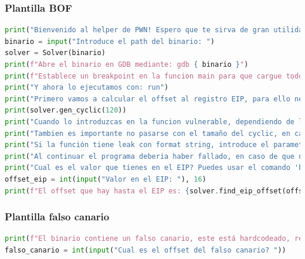 \subsubsection{Plantilla BOF}
\begin{lstlisting}[language=Python, caption=Plantilla BOF]
print("Bienvenido al helper de PWN! Espero que te sirva de gran utilidad!")
binario = input("Introduce el path del binario: ")
solver = Solver(binario)
print(f"Abre el binario en GDB mediante: gdb { binario }")
print(f"Establece un breakpoint en la funcion main para que cargue todo: b main")
print("Y ahora lo ejecutamos con: run")
print("Primero vamos a calcular el offset al registro EIP, para ello necesitamos ir a la funcion vulnerable e introducir un payload ciclico, por ejemplo:")
print(solver.gen_cyclic(120))
print("Cuando lo introduzcas en la funcion vulnerable, dependiendo de las mitigaciones habilitadas, el resultado podría ser diferente")
print("Tambien es importante no pasarse con el tamaño del cyclic, en caso de que se rompa el puntero a buf strcat podría fallar")
print("Si la función tiene leak con format string, introduce el parametro en la segunda funcion de input")
print("Al continuar el programa deberia haber fallado, en caso de que no sea asi, la longitud del payload no fue suficiente, intentalo con otro mas largo!")
print("Cual es el valor que tienes en el EIP? Puedes usar el comando 'bt' para ver el callstack, busca el valor justo despues de la funcion de input")
offset_eip = int(input("Valor en el EIP: "), 16)
print(f"El offset que hay hasta el EIP es: {solver.find_eip_offset(offset_eip)}")
\end{lstlisting}
\subsubsection{Plantilla falso canario}
\begin{lstlisting}[language=Python, caption=Plantilla falso canario]
print(f"El binario contiene un falso canario, este está hardcodeado, revisa en el código fuente o el ensamblador cual es su valor, después saca el offset siguiendo los pasos anteriores")
falso_canario = int(input("Cual es el offset del falso canario? "))
\end{lstlisting}

